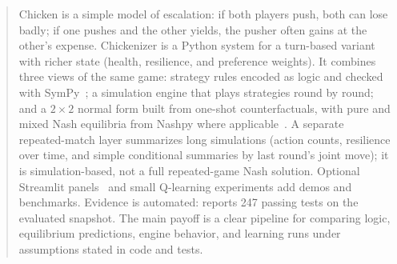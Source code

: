 \begin{abstract}
Chicken is a simple model of escalation: if both players push, both can lose badly; if one pushes and the other yields, the pusher often gains at the other's expense. Chickenizer is a Python system for a turn-based variant with richer state (health, resilience, and preference weights). It combines three views of the same game: strategy rules encoded as logic and checked with SymPy~\cite{sympy}; a simulation engine that plays strategies round by round; and a $2\times 2$ normal form built from one-shot counterfactuals, with pure and mixed Nash equilibria from Nashpy where applicable~\cite{nashpy,nash1950}. A separate repeated-match layer summarizes long simulations (action counts, resilience over time, and simple conditional summaries by last round's joint move); it is simulation-based, not a full repeated-game Nash solution. Optional Streamlit panels~\cite{streamlit} and small Q-learning experiments add demos and benchmarks. Evidence is automated:  reports 247 passing tests on the evaluated snapshot. The main payoff is a clear pipeline for comparing logic, equilibrium predictions, engine behavior, and learning runs under assumptions stated in code and tests.
\end{abstract}
